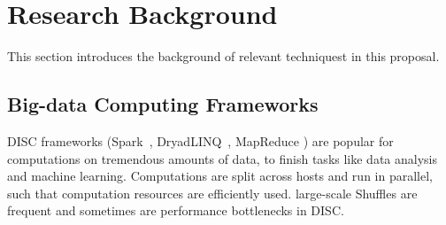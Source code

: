 \vspace{-.15in}\section{Research Background} 
\label{sec:background}\vspace{-.075in}

This section introduces the background of relevant techniquest in this proposal.


\vspace{-.15in}\subsection{Big-data Computing Frameworks} 
\label{sec:bigdata}\vspace{-.075in}

DISC frameworks (\eg Spark~\cite{nsdi12:spark},
DryadLINQ~\cite{osdi08:dryad}, MapReduce \cite{mapreduce}) are popular for 
computations
on tremendous
amounts of data, to finish tasks like data analysis and machine learning.
Computations are split across hosts and run in parallel, such that
computation resources are efficiently used.
large-scale
Shuffles are frequent and sometimes are performance bottlenecks in DISC.



